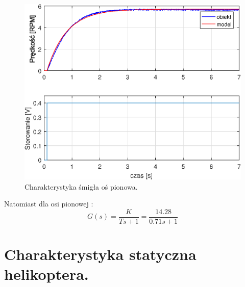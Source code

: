 \begin{figure}[h!]
	\centering
	\includegraphics[scale = 1]{fig/Pitch_iden.eps}
	\caption		
	{Charakterystyka śmigła oś pionowa.}
\end{figure} 
Natomiast dla osi pionowej : 
\begin{equation}\label{key}
G(s) = \frac{K}{Ts + 1} = \frac{14.28}{0.71s + 1}
\end{equation}
 
 
\section{Charakterystyka statyczna helikoptera.}

